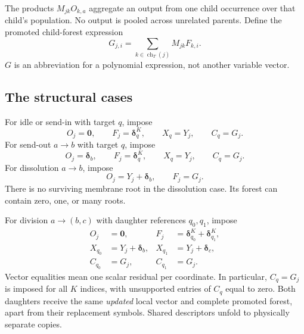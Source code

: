 \documentclass[11pt,letterpaper]{article}
\theoremstyle{definition}
\theoremstyle{remark}
\newcommand{\ch}{\operatorname{ch}}
\newcommand{\ee}{\boldsymbol\delta}
\newcommand{\mmzero}{\boldsymbol 0}
\begin{document}
The products $M_{jk}O_{k,a}$ aggregate an output from one child occurrence over that child's population. No output is pooled across unrelated parents. Define the promoted child-forest expression
\begin{equation}\tag{G}\label{qoc:mm:eq:G}
 G_{j,i}=\sum_{k\in\ch_T(j)}M_{jk}F_{k,i}.
\end{equation}
$G$ is an abbreviation for a polynomial expression, not another variable vector.

\subsection{The structural cases}
For idle or send-in with target $q$, impose
\begin{equation}\label{qoc:mm:eq:idle}
 O_j=\mmzero,\qquad F_j=\ee_q^K,\qquad X_q=Y_j,\qquad C_q=G_j.
\end{equation}
For send-out $a\to b$ with target $q$, impose
\begin{equation}\label{qoc:mm:eq:out}
 O_j=\ee_b,\qquad F_j=\ee_q^K,\qquad X_q=Y_j,\qquad C_q=G_j.
\end{equation}
For dissolution $a\to b$, impose
\begin{equation}\label{qoc:mm:eq:dissolve}
 O_j=Y_j+\ee_b,\qquad F_j=G_j.
\end{equation}
There is no surviving membrane root in the dissolution case. Its forest can contain zero, one, or many roots.

For division $a\to(b,c)$ with daughter references $q_0,q_1$, impose
\begin{align}
 O_j&=\mmzero,& F_j&=\ee_{q_0}^K+\ee_{q_1}^K,\label{qoc:mm:eq:divide1}\\
 X_{q_0}&=Y_j+\ee_b,& X_{q_1}&=Y_j+\ee_c,\label{qoc:mm:eq:divide2}\\
 C_{q_0}&=G_j,& C_{q_1}&=G_j.\label{qoc:mm:eq:divide3}
\end{align}
Vector equalities mean one scalar residual per coordinate. In particular, $C_q=G_j$ is imposed for all $K$ indices, with unsupported entries of $C_q$ equal to zero. Both daughters receive the same \emph{updated} local vector and complete promoted forest, apart from their replacement symbols. Shared descriptors unfold to physically separate copies.
\end{document}
